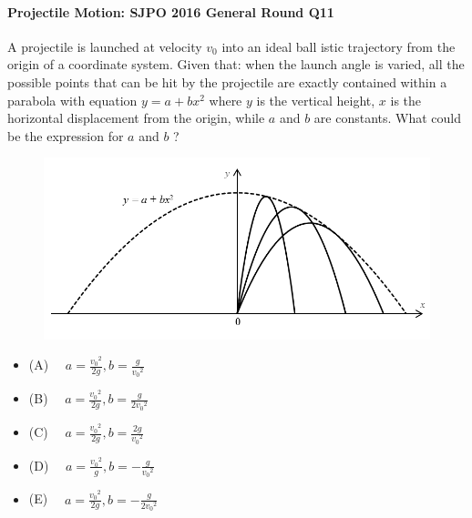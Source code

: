 \documentclass{article}
\begin{document}
\begin{samepage}
\paragraph{Projectile Motion: SJPO 2016 General Round Q11}
A projectile is launched at velocity $v_0$ into an ideal ball istic trajectory from the origin of a coordinate system. Given that: when the launch angle is varied, all the possible points that can be hit by the projectile are exactly contained within a parabola with equation $y=a+b x^2$ where $y$ is the vertical height, $x$ is the horizontal displacement from the origin, while $a$ and $b$ are constants. What could be the expression for $a$ and $b$ ?\\
 \begin{figure} 
\includegraphics[width=\linewidth]{images/sjpo2016q11.png}
\end{figure}
\begin{itemize}
\item[](A) $\quad a=\frac{v_0{ }^2}{2 g}, b=\frac{g}{v_0{ }^2}$
\item[](B) $\quad a=\frac{v_0{ }^2}{2 g}, b=\frac{g}{2 v_0{ }^2}$
\item[](C) $\quad a=\frac{v_0{ }^2}{2 g}, b=\frac{2 g}{v_0{ }^2}$
\item[](D) $\quad a=\frac{v_0{ }^2}{g}, b=-\frac{g}{v_0{ }^2}$
\item[](E) $\quad a=\frac{v_0{ }^2}{2 g}, b=-\frac{g}{2 v_0{ }^2}$
\end{itemize}
\end{samepage}
\end{document}
